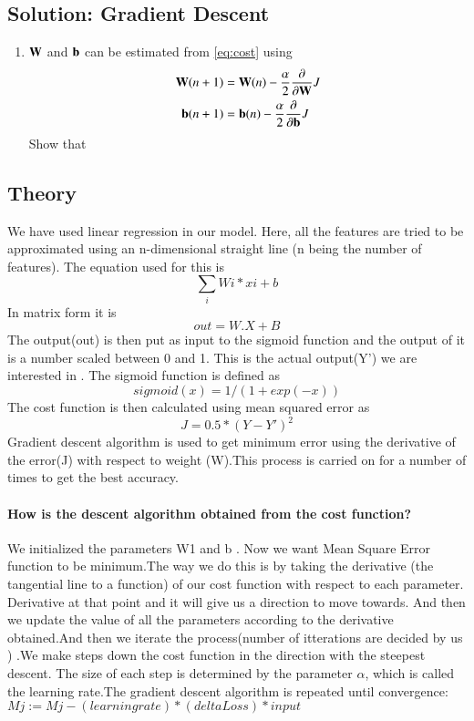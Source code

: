 \documentclass[journal,12pt,twocolumn]{IEEEtran}
\renewcommand\thesection{\arabic{section}}
\renewcommand\thesubsection{\thesection.\arabic{subsection}}
\begin{document}
\subsection{Solution: Gradient Descent}
\begin{enumerate}[label=\thesubsection.\arabic*
,ref=\thesection.\theenumi]
\item $\mathbf{W}$ and $\mathbf{b}$ can be estimated from \eqref{eq:cost} using
\begin{align}
\mathbf{W}(n+1) &= \mathbf{W}(n) - \frac{\alpha}{2}\frac{\partial}{\partial\mathbf{W}}J
\\
\mathbf{b}(n+1) &= \mathbf{b}(n) - \frac{\alpha}{2}\frac{\partial}{\partial\mathbf{b}}J
\end{align}
Show that
\end{enumerate}
\subsection{Theory}
We have used linear regression in our model. Here, all the features are tried to be approximated using an n-dimensional straight line (n being the number of features). The equation used for this is 
\begin{equation}
\sum_{i} Wi*xi + b
\end{equation}
In matrix form it is $$ out = W.X + B $$ The output(out) is then put as input to the sigmoid function and the output of it is a number scaled between 0 and 1. This is the actual output(Y') we are interested in .  The sigmoid function is defined as $$sigmoid(x) = 1/(1+exp(-x))$$ The cost function is then calculated using mean squared error as $$ J = 0.5*(Y - Y')^2$$ Gradient descent algorithm is used to get minimum error using the derivative of the error(J) with respect to weight (W).This process is carried on for a number of times to get the best accuracy.
\paragraph{How is the descent algorithm obtained from the cost function?\newline}
We initialized the parameters W1 and b . Now we want Mean Square Error function to 
be minimum.The way we do this is by taking the derivative (the tangential line to a 
function) of our cost function with respect to each parameter. Derivative at that 
point and it will give us a direction to move towards. And then we update the value 
of all the parameters according to the derivative obtained.And then we iterate the 
process(number of itterations are decided by us ) .We make steps down the cost 
function in the direction with the steepest descent. The size of each step is 
determined by the parameter $\alpha$, which is called the learning rate.The gradient 
descent algorithm is repeated until convergence: 
$Mj :=Mj-(learningrate)*(delta Loss)*input$
\end{document}
